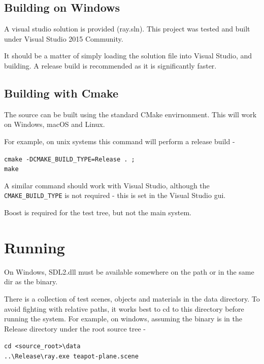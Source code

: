 \subsection{Building on Windows}
A visual studio solution is provided (ray.sln). This project was tested and built under Visual Studio 2015 Community. 

It should be a matter of simply loading the solution file into Visual Studio, and building. A release build is recommended as it is significantly faster.

\subsection{Building with Cmake}
The source can be built using the standard CMake envirnonment. This will work on Windows, macOS and Linux. 

For example, on unix systems this command will perform a release build -

\verb|cmake -DCMAKE_BUILD_TYPE=Release . ;| \\
\verb|make|

A similar command should work with Visual Studio, although the \verb|CMAKE_BUILD_TYPE| is not required - this is set in the Visual Studio gui.


Boost is required for the test tree, but not the main system.

\section{Running}

On Windows, SDL2.dll must be available somewhere on the path or in the same dir as the binary. 

There is a collection of test scenes, objects and materials in the data directory. To avoid fighting with relative paths, it works best to cd to this directory before running the system. For example, on windows, assuming the binary is in the Release directory under the root source tree - 

\verb|cd <source_root>\data| \\
\verb|..\Release\ray.exe teapot-plane.scene|

